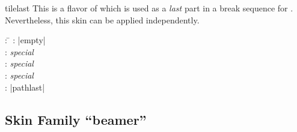 \begin{dispExample}
\end{dispExample}


\clearpage
\begin{docSkin}[doc new=2016-02-25]{tilelast}
This is a flavor of  which is used as a \emph{last} part
in a break sequence for .
Nevertheless, this skin can be applied independently.
\begin{tcolorbox}[skintable=tilelast]
  \begin{tabbing}
    : \=\kill
    :           \> |empty|\\
    : \> \emph{special}\\ 
    :        \> \emph{special}\\
    :    \> \emph{special}\\
    :           \> |pathlast|
  \end{tabbing}
\end{tcolorbox}
\end{docSkin}


\begin{dispExample}
\end{dispExample}



\clearpage
\subsection{Skin Family \enquote{beamer}}

